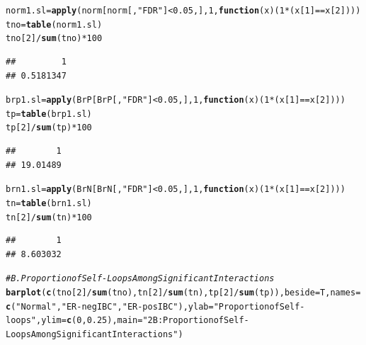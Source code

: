 \documentclass{article}\usepackage[]{graphicx}\usepackage[]{color}
\makeatletter
\newcommand{\hlnum}[1]{\textcolor[rgb]{0.686,0.059,0.569}{#1}}%
\newcommand{\hlstr}[1]{\textcolor[rgb]{0.192,0.494,0.8}{#1}}%
\newcommand{\hlcom}[1]{\textcolor[rgb]{0.678,0.584,0.686}{\textit{#1}}}%
\newcommand{\hlopt}[1]{\textcolor[rgb]{0,0,0}{#1}}%
\newcommand{\hlstd}[1]{\textcolor[rgb]{0.345,0.345,0.345}{#1}}%
\newcommand{\hlkwa}[1]{\textcolor[rgb]{0.161,0.373,0.58}{\textbf{#1}}}%
\newcommand{\hlkwb}[1]{\textcolor[rgb]{0.69,0.353,0.396}{#1}}%
\newcommand{\hlkwc}[1]{\textcolor[rgb]{0.333,0.667,0.333}{#1}}%
\newcommand{\hlkwd}[1]{\textcolor[rgb]{0.737,0.353,0.396}{\textbf{#1}}}%
\newenvironment{kframe}{%
 \def\at@end@of@kframe{}%
 \ifinner\ifhmode%
  \def\at@end@of@kframe{\end{minipage}}%
  \begin{minipage}{\columnwidth}%
 \fi\fi%
 \def\FrameCommand##1{\hskip\@totalleftmargin \hskip-\fboxsep
 \colorbox{shadecolor}{##1}\hskip-\fboxsep
     \hskip-\linewidth \hskip-\@totalleftmargin \hskip\columnwidth}%
 \MakeFramed {\advance\hsize-\width
   \@totalleftmargin\z@ \linewidth\hsize
   \@setminipage}}%
 {\par\unskip\endMakeFramed%
 \at@end@of@kframe}
\newenvironment{knitrout}{}{} %
\makeatother
\begin{document}
\begin{knitrout}
\begin{kframe}
\begin{alltt}
\hlstd{norm1.sl}\hlkwb{=}\hlkwd{apply}\hlstd{(norm[norm[,}\hlstr{"FDR"}\hlstd{]}\hlopt{<}\hlnum{0.05}\hlstd{,],}\hlnum{1}\hlstd{,}\hlkwa{function}\hlstd{(}\hlkwc{x}\hlstd{)(}\hlnum{1}\hlopt{*}\hlstd{(x[}\hlnum{1}\hlstd{]}\hlopt{==}\hlstd{x[}\hlnum{2}\hlstd{])))}
\hlstd{tno}\hlkwb{=}\hlkwd{table}\hlstd{(norm1.sl)}
\hlstd{tno[}\hlnum{2}\hlstd{]}\hlopt{/}\hlkwd{sum}\hlstd{(tno)} \hlopt{*} \hlnum{100}
\end{alltt}
\begin{verbatim}
##         1 
## 0.5181347
\end{verbatim}
\begin{alltt}
\hlstd{brp1.sl}\hlkwb{=}\hlkwd{apply}\hlstd{(BrP[BrP[,}\hlstr{"FDR"}\hlstd{]}\hlopt{<}\hlnum{0.05}\hlstd{,],}\hlnum{1}\hlstd{,}\hlkwa{function}\hlstd{(}\hlkwc{x}\hlstd{)(}\hlnum{1}\hlopt{*}\hlstd{(x[}\hlnum{1}\hlstd{]}\hlopt{==}\hlstd{x[}\hlnum{2}\hlstd{])))}
\hlstd{tp}\hlkwb{=}\hlkwd{table}\hlstd{(brp1.sl)}
\hlstd{tp[}\hlnum{2}\hlstd{]}\hlopt{/}\hlkwd{sum}\hlstd{(tp)} \hlopt{*} \hlnum{100}
\end{alltt}
\begin{verbatim}
##        1 
## 19.01489
\end{verbatim}
\begin{alltt}
\hlstd{brn1.sl}\hlkwb{=}\hlkwd{apply}\hlstd{(BrN[BrN[,}\hlstr{"FDR"}\hlstd{]}\hlopt{<}\hlnum{0.05}\hlstd{,],}\hlnum{1}\hlstd{,}\hlkwa{function}\hlstd{(}\hlkwc{x}\hlstd{)(}\hlnum{1}\hlopt{*}\hlstd{(x[}\hlnum{1}\hlstd{]}\hlopt{==}\hlstd{x[}\hlnum{2}\hlstd{])))}
\hlstd{tn}\hlkwb{=}\hlkwd{table}\hlstd{(brn1.sl)}
\hlstd{tn[}\hlnum{2}\hlstd{]}\hlopt{/}\hlkwd{sum}\hlstd{(tn)} \hlopt{*} \hlnum{100}
\end{alltt}
\begin{verbatim}
##        1 
## 8.603032
\end{verbatim}
\begin{alltt}
\hlcom{# B. Proportion of Self-Loops Among Significant Interactions}
\hlkwd{barplot}\hlstd{(}\hlkwd{c}\hlstd{(tno[}\hlnum{2}\hlstd{]}\hlopt{/}\hlkwd{sum}\hlstd{(tno), tn[}\hlnum{2}\hlstd{]}\hlopt{/}\hlkwd{sum}\hlstd{(tn),tp[}\hlnum{2}\hlstd{]}\hlopt{/}\hlkwd{sum}\hlstd{(tp)),}\hlkwc{beside}\hlstd{=T,}\hlkwc{names}\hlstd{=}\hlkwd{c}\hlstd{(}\hlstr{"Normal"}\hlstd{,}\hlstr{"ER-neg IBC"}\hlstd{,}\hlstr{"ER-pos IBC"}\hlstd{),}\hlkwc{ylab}\hlstd{=}\hlstr{"Proportion of Self-loops"}\hlstd{,}\hlkwc{ylim}\hlstd{=}\hlkwd{c}\hlstd{(}\hlnum{0}\hlstd{,}\hlnum{0.25}\hlstd{),}\hlkwc{main}\hlstd{=}\hlstr{"2B: Proportion of Self-Loops Among Significant Interactions"}\hlstd{)}
\end{alltt}

\end{kframe}
\end{knitrout}
\end{document}
